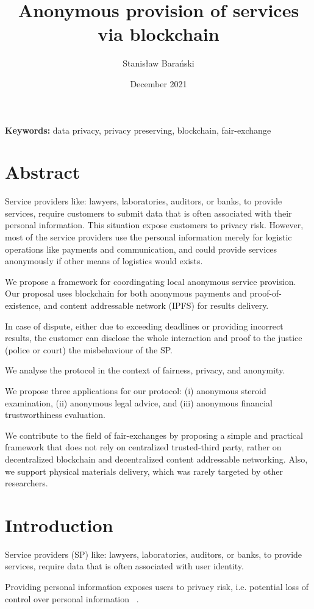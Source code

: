 \documentclass{article}
\title{Anonymous provision of services via blockchain}
\author{Stanisław Barański}
\date{December 2021}
\providecommand{\keywords}[1]{\textbf{Keywords:} #1}
\begin{document}
\maketitle
\keywords{data privacy, privacy preserving, blockchain, fair-exchange}



\section{Abstract}
Service providers like: lawyers, laboratories, auditors, or banks, to provide services, require customers to submit data that is often associated with their personal information. This situation expose customers to privacy risk. However, most of the service providers use the personal information merely for logistic operations like payments and communication, and could provide services anonymously if other means of logistics would exists.

We propose a framework for coordingating local anonymous service provision. Our proposal uses blockchain for both anonymous payments and proof-of-existence, and content addressable network (IPFS) for results delivery.

In case of dispute, either due to exceeding deadlines or providing incorrect results, the customer can disclose the whole interaction and proof to the justice (police or court) the misbehaviour of the SP.

We analyse the protocol in the context of fairness, privacy, and anonymity.

We propose three applications for our protocol: (i) anonymous steroid examination, (ii) anonymous legal advice, and (iii) anonymous financial trustworthiness evaluation.

We contribute to the field of fair-exchanges by proposing a simple and practical framework that does not rely on centralized trusted-third party, rather on decentralized blockchain and decentralized content addressable networking. Also, we support physical materials delivery, which was rarely targeted by other researchers.

\section{Introduction}
Service providers (SP) like: lawyers, laboratories, auditors, or banks, to provide services, require data that is often associated with user identity.

Providing personal information exposes users to privacy risk, i.e. potential loss of control over personal information ~\cite{smith2011information}. 
\end{document}
